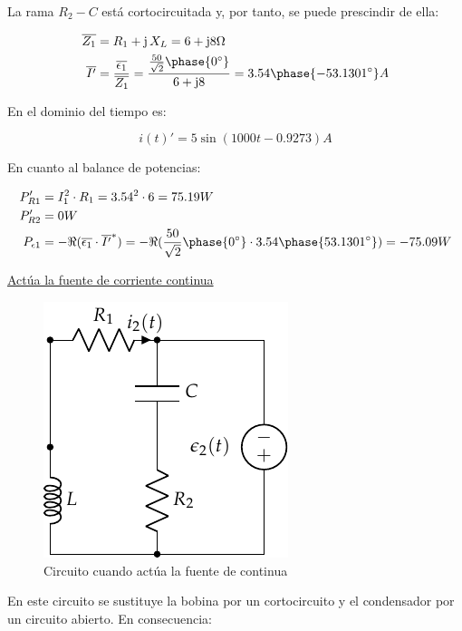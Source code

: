 \documentclass[11pt]{book} %
\begin{document}
\begin{example}
La rama $R_2 - C$ está cortocircuitada y, por tanto, se puede prescindir de ella:

\begin{align*}
  \overline{Z_1} &= R_1 + \mathrm{j}\,X_L = 6 + \mathrm{j}8\Omega\\
  \overline{I'} &= \dfrac{\overline{\epsilon_1}}{\overline{Z_1}} = \dfrac{\frac{50}{\sqrt{2}}\phase{0^\circ}}{6+\mathrm{j}8}=3.54\phase{-53.1301^\circ} A
\end{align*}

En el dominio del tiempo es:

\begin{equation*}
  i(t)' = 5\sin(1000t - 0.9273) A
\end{equation*}

En cuanto al balance de potencias:

\begin{align*}
  P_{R1}' &= I_1^2\cdot R_1= 3.54^2\cdot 6= {75.19}{W}\\
  P_{R2}' &= {0} W\\
  P_{\epsilon1} &= -\Re(\overline{\epsilon_1} \cdot \overline{I'}^*) = - \Re(\dfrac{50}{\sqrt{2}}\phase{0^\circ}\cdot 3.54\phase{53.1301^\circ}) = -{75.09} W
\end{align*}

\underline{Actúa la fuente de corriente continua}

\begin{figure}[H]
    \centering
    \includegraphics{../figs/superposicion1_DC.pdf}
    \caption{Circuito cuando actúa la fuente de continua}
    \label{fig.superposicion1_DC}
\end{figure}

En este circuito se sustituye la bobina por un cortocircuito y el condensador por un circuito abierto. En consecuencia:


\end{example}
\end{document}
